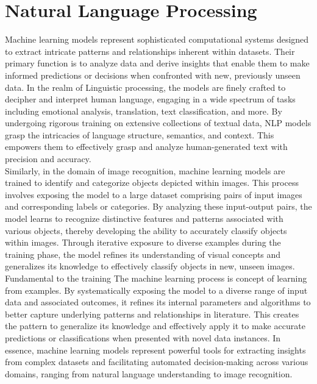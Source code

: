 \section{Natural Language Processing }
Machine learning models represent sophisticated computational systems designed to extract intricate patterns and relationships inherent within datasets. Their primary function is to analyze data and derive insights that enable them to make informed predictions or decisions when confronted with new, previously unseen data. In the realm of Linguistic processing, the models are finely crafted to decipher and interpret human language, engaging in a wide spectrum of tasks including emotional analysis, translation, text classification, and more. By undergoing rigorous training on extensive collections of textual data, NLP models grasp the intricacies of language structure, semantics, and context. This empowers them to effectively grasp and analyze human-generated text with precision and accuracy.
\\
Similarly, in the domain of image recognition, machine learning models are trained to identify and categorize objects depicted within images. This process involves exposing the model to a large dataset comprising pairs of input images and corresponding labels or categories. By analyzing these input-output pairs, the model learns to recognize distinctive features and patterns associated with various objects, thereby developing the ability to accurately classify objects within images. Through iterative exposure to diverse examples during the training phase, the model refines its understanding of visual concepts and generalizes its knowledge to effectively classify objects in new, unseen images.
\\
Fundamental to the training The machine learning process is concept of learning from examples. By systematically exposing the model to a diverse range of input data and associated outcomes, it refines its internal parameters and algorithms to better capture underlying patterns and relationships in literature. This creates the pattern to generalize its knowledge and effectively apply it to make accurate predictions or classifications when presented with novel data instances. In essence, machine learning models represent powerful tools for extracting insights from complex datasets and facilitating automated decision-making across various domains, ranging from natural language understanding to image recognition.
\\
